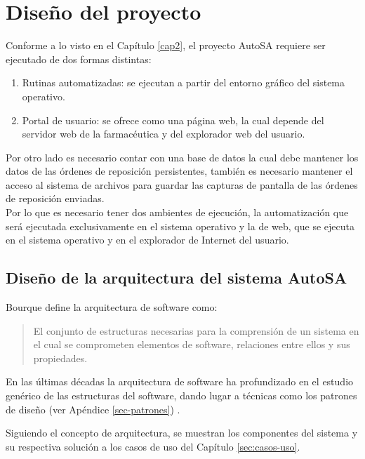 \chapter{Diseño del proyecto}\label{cap3}
Conforme a lo visto en el Capítulo \ref{cap2}, el proyecto AutoSA requiere ser ejecutado de dos formas distintas:
\begin{enumerate}
 	\item Rutinas automatizadas: se ejecutan a partir del entorno gráfico del sistema operativo.
 	\item Portal de usuario: se ofrece como una página web, la cual depende del servidor web de la farmacéutica y del explorador web del usuario.
\end{enumerate}
Por otro lado es necesario contar con una base de datos la cual debe mantener los datos de las órdenes de reposición persistentes, también es necesario mantener el acceso al sistema de archivos para guardar las capturas de pantalla de las órdenes de reposición enviadas.\\
Por lo que es necesario tener dos ambientes de ejecución, la automatización que será ejecutada exclusivamente en el sistema operativo y la de web, que se ejecuta en el sistema operativo y en el explorador de Internet del usuario.




\section{Diseño de la arquitectura del sistema AutoSA}
Bourque define la arquitectura de software como:
\begin{quote}
	El conjunto de estructuras necesarias para la comprensión de un sistema en el cual se comprometen elementos de software, relaciones entre ellos y sus propiedades\cite{SWEBOOK}.
\end{quote}
En las últimas décadas la arquitectura de software ha profundizado en el estudio genérico de las estructuras del software, dando lugar a técnicas como los patrones de diseño (ver Apéndice \ref{sec-patrones}) \cite{SWEBOOK, SoftwareArchitectureInAction}.

Siguiendo el concepto de arquitectura, se muestran los componentes del sistema y su respectiva solución a los casos de uso del Capítulo \ref{sec:casos-uso}.

